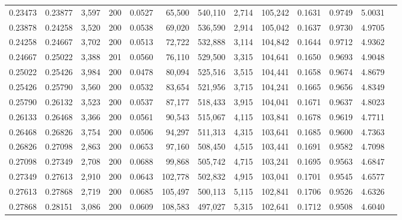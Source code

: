 \begin{tabular}{rrrrrrrrrrrrr}
0.23473 & 0.23877 & 3,597 & 200 &                                     0.0527 &  65,500 & 540,110 &   2,714 & 105,242 & 0.1631 & 0.9749 & 5.0031 \\
0.23878 & 0.24258 & 3,520 & 200 &                                     0.0538 &  69,020 & 536,590 &   2,914 & 105,042 & 0.1637 & 0.9730 & 4.9705 \\
0.24258 & 0.24667 & 3,702 & 200 &                                     0.0513 &  72,722 & 532,888 &   3,114 & 104,842 & 0.1644 & 0.9712 & 4.9362 \\
0.24667 & 0.25022 & 3,388 & 201 &                                     0.0560 &  76,110 & 529,500 &   3,315 & 104,641 & 0.1650 & 0.9693 & 4.9048 \\
0.25022 & 0.25426 & 3,984 & 200 &                                     0.0478 &  80,094 & 525,516 &   3,515 & 104,441 & 0.1658 & 0.9674 & 4.8679 \\
0.25426 & 0.25790 & 3,560 & 200 &                                     0.0532 &  83,654 & 521,956 &   3,715 & 104,241 & 0.1665 & 0.9656 & 4.8349 \\
0.25790 & 0.26132 & 3,523 & 200 &                                     0.0537 &  87,177 & 518,433 &   3,915 & 104,041 & 0.1671 & 0.9637 & 4.8023 \\
0.26133 & 0.26468 & 3,366 & 200 &                                     0.0561 &  90,543 & 515,067 &   4,115 & 103,841 & 0.1678 & 0.9619 & 4.7711 \\
0.26468 & 0.26826 & 3,754 & 200 &                                     0.0506 &  94,297 & 511,313 &   4,315 & 103,641 & 0.1685 & 0.9600 & 4.7363 \\
0.26826 & 0.27098 & 2,863 & 200 &                                     0.0653 &  97,160 & 508,450 &   4,515 & 103,441 & 0.1691 & 0.9582 & 4.7098 \\
0.27098 & 0.27349 & 2,708 & 200 &                                     0.0688 &  99,868 & 505,742 &   4,715 & 103,241 & 0.1695 & 0.9563 & 4.6847 \\
0.27349 & 0.27613 & 2,910 & 200 &                                     0.0643 & 102,778 & 502,832 &   4,915 & 103,041 & 0.1701 & 0.9545 & 4.6577 \\
0.27613 & 0.27868 & 2,719 & 200 &                                     0.0685 & 105,497 & 500,113 &   5,115 & 102,841 & 0.1706 & 0.9526 & 4.6326 \\
0.27868 & 0.28151 & 3,086 & 200 &                                     0.0609 & 108,583 & 497,027 &   5,315 & 102,641 & 0.1712 & 0.9508 & 4.6040 \\

\end{tabular}

